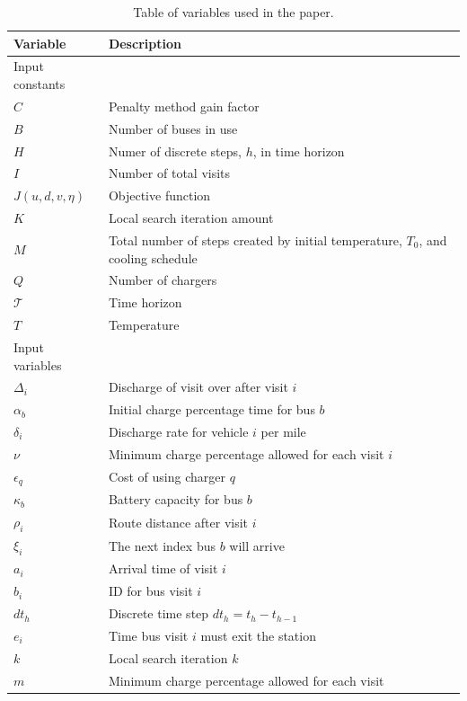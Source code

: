\documentclass[11pt,a4paper,final]{article}
\newcommand{\T}{\mathcal{T}}                %
\newcommand{\Tau}{T}                        %
\begin{document}
\begin{table}[htbp]
\caption{\label{tab:variables}Table of variables used in the paper.}
\centering
\begin{tabular}{ll}
\textbf{Variable} & \textbf{Description}\\[0pt]
\hline
Input constants & \\[0pt]
\(C\) & Penalty method gain factor\\[0pt]
\(B\) & Number of buses in use\\[0pt]
\(H\) & Numer of discrete steps, \(h\), in time horizon\\[0pt]
\(I\) & Number of total visits\\[0pt]
\(J(u,d,v,\eta)\) & Objective function\\[0pt]
\(K\) & Local search iteration amount\\[0pt]
\(M\) & Total number of steps created by initial temperature, \(\Tau_0\), and cooling schedule\\[0pt]
\(Q\) & Number of chargers\\[0pt]
\(\T\) & Time horizon\\[0pt]
\(\Tau\) & Temperature\\[0pt]
\hline
Input variables & \\[0pt]
\(\Delta_i\) & Discharge of visit over after visit \(i\)\\[0pt]
\(\alpha_b\) & Initial charge percentage time for bus \(b\)\\[0pt]
\(\delta_i\) & Discharge rate for vehicle \(i\) per mile\\[0pt]
\(\nu\) & Minimum charge percentage allowed for each visit \(i\)\\[0pt]
\(\epsilon_q\) & Cost of using charger \(q\)\\[0pt]
\(\kappa_b\) & Battery capacity for bus \(b\)\\[0pt]
\(\rho_i\) & Route distance after visit \(i\)\\[0pt]
\(\xi_i\) & The next index bus \(b\) will arrive\\[0pt]
\(a_i\) & Arrival time of visit \(i\)\\[0pt]
\(b_i\) & ID for bus visit \(i\)\\[0pt]
\(dt_h\) & Discrete time step \(dt_h = t_h - t_{h-1}\)\\[0pt]
\(e_i\) & Time bus visit \(i\) must exit the station\\[0pt]
\(k\) & Local search iteration \(k\)\\[0pt]
\(m\) & Minimum charge percentage allowed for each visit\\[0pt]

\end{tabular}
\end{table}
\end{document}
